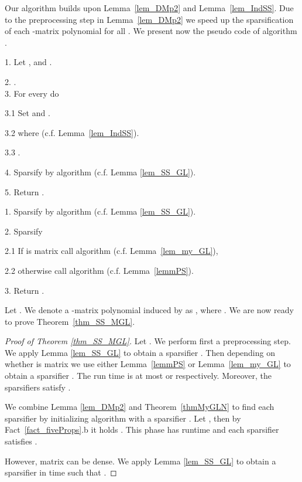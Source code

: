 \documentclass[11pt]{article}
\numberwithin{thm}{section}
\begin{document}
Our algorithm  builds upon Lemma~\ref{lem_DMp2} and Lemma~\ref{lem_IndSS}. Due to the preprocessing step in Lemma~\ref{lem_DMp2} we speed up the sparsification of each -matrix polynomial  for all . We present now the pseudo code of algorithm .

\begin{algorithm}[H]
\caption{}
\label{alg_SSMDBD}



1. Let ,  and  .

2. .\\
3. For every  do

3.1 Set  and .

3.2 
where  (c.f. Lemma~\ref{lem_IndSS}).

3.3 .

4. Sparsify 
by algorithm  (c.f. Lemma \ref{lem_SS_GL}).

5. Return .
\end{algorithm}


\begin{algorithm}[H]
\caption{}
\label{alg_Preprocess}



1. Sparsify  by algorithm  (c.f. Lemma \ref{lem_SS_GL}).

2. Sparsify 

2.1 If  is  matrix call algorithm  (c.f. Lemma~\ref{lem_my_GL}),

2.2 otherwise call algorithm  (c.f. Lemma~\ref{lemmPS}).

3. Return .
\end{algorithm}

Let . We denote a -matrix polynomial induced by   as
,
where . We are now ready to prove Theorem~\ref{thm_SS_MGL}.

\begin{proof}[Proof of Theorem \ref{thm_SS_MGL}] Let .
We perform first a preprocessing step. We apply Lemma \ref{lem_SS_GL}
to obtain a sparsifier .
Then depending on whether  is  matrix
we use either Lemma~\ref{lemmPS} or Lemma~\ref{lem_my_GL}
to obtain a sparsifier .
The run time is at most  or  respectively. Moreover, the sparsifiers satisfy .

We combine Lemma \ref{lem_DMp2} and Theorem~\ref{thmMyGLN}
to find each sparsifier 
by initializing algorithm  with a sparsifier .
Let , then by Fact~\ref{fact_fiveProps}.b it holds .
This phase has  runtime and each sparsifier satisfies .

However, matrix  can be dense. We
apply Lemma \ref{lem_SS_GL} to obtain a sparsifier 
in time 
such that .
\end{proof}
\end{document}
